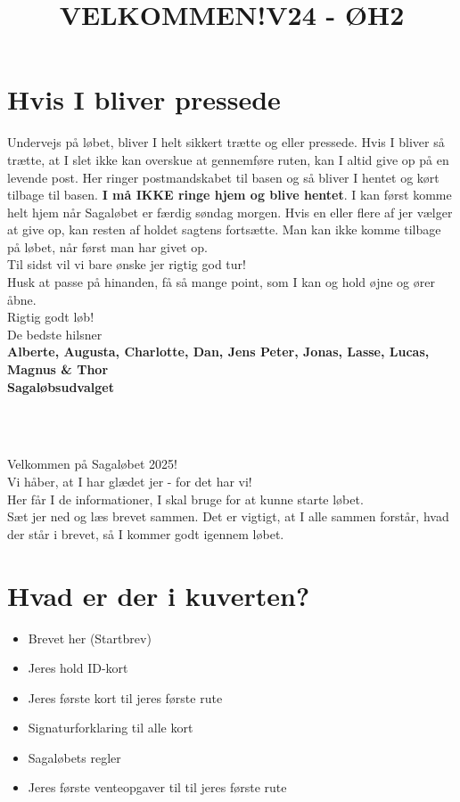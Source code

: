 \section{Hvis I bliver pressede}
Undervejs på løbet, bliver I helt sikkert trætte og eller pressede. Hvis I bliver så trætte, at I slet ikke kan overskue at gennemføre ruten, kan I altid give op på en levende post. Her ringer postmandskabet til basen og så bliver I hentet og kørt tilbage til basen. \textbf{I må IKKE ringe hjem og blive hentet}. I kan først komme helt hjem når Sagaløbet er færdig søndag morgen. Hvis en eller flere af jer vælger at give op, kan resten af holdet sagtens fortsætte. Man kan ikke komme tilbage på løbet, når først man har givet op.\\
\newline
Til sidst vil vi bare ønske jer rigtig god tur!\\
Husk at passe på hinanden, få så mange point, som I kan og hold øjne og ører åbne.\\
\newline
Rigtig godt løb!\\
\newline
\textcolor{søblå}{De bedste hilsner}\\
\textcolor{natblå}{\textbf{Alberte, Augusta, Charlotte, Dan, Jens Peter, Jonas, Lasse, Lucas, Magnus \& Thor}}\\
\textcolor{natblå}{\textbf{Sagaløbsudvalget}}\\
\newpage
\title{VELKOMMEN!}\\
\newline
\title{\textcolor{søblå}{V24 - ØH2 }}\\
\newline
Velkommen på Sagaløbet 2025!\\
Vi håber, at I har glædet jer - for det har vi!\\
Her får I de informationer, I skal bruge for at kunne starte løbet.\\
Sæt jer ned og læs brevet sammen. Det er vigtigt, at I alle sammen forstår, hvad der står i brevet, så I kommer godt igennem løbet.
\section{Hvad er der i kuverten?}
\begin{itemize}
    \item Brevet her (Startbrev)
    \item Jeres hold ID-kort
    \item Jeres første kort til jeres første rute
    \item Signaturforklaring til alle kort
    \item Sagaløbets regler
    \item Jeres første venteopgaver til til jeres første rute
\end{itemize}
